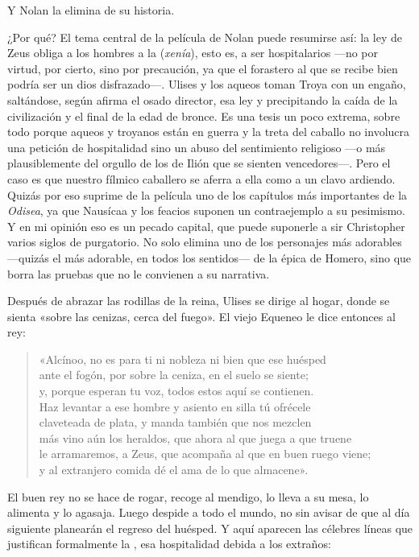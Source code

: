 Y Nolan la elimina de su historia.

¿Por qué? El tema central de la película de Nolan puede resumirse así: la ley de Zeus obliga a los hombres a la  (\emph{xenía}), esto es, a ser hospitalarios ---no por virtud, por cierto, sino por precaución, ya que el forastero al que se recibe bien podría ser un dios disfrazado---. Ulises y los aqueos toman Troya con un engaño, saltándose, según afirma el osado director, esa ley y precipitando la caída de la civilización y el final de la edad de bronce. Es una tesis un poco extrema, sobre todo porque aqueos y troyanos están en guerra y la treta del caballo no involucra una petición de hospitalidad sino un abuso del sentimiento religioso ---o más plausiblemente del orgullo de los de Ilión que se sienten vencedores---. Pero el caso es que nuestro fílmico caballero se aferra a ella como a un clavo ardiendo. Quizás por eso suprime de la película uno de los capítulos más importantes de la \emph{Odisea}, ya que Nausícaa y los feacios suponen un contraejemplo a su pesimismo. Y en mi opinión eso es un pecado capital, que puede suponerle a sir Christopher varios siglos de purgatorio. No solo elimina uno de los personajes más adorables ---quizás el más adorable, en todos los sentidos--- de la épica de Homero, sino que borra las pruebas que no le convienen a su narrativa.

Después de abrazar las rodillas de la reina, Ulises se dirige al hogar, donde se sienta «sobre las cenizas, cerca del fuego».
El viejo Equeneo le dice entonces al rey:

\begin{verse}
«Alcínoo, no es para ti ni nobleza ni bien que ese huésped\\
ante el fogón, por sobre la ceniza, en el suelo se siente;\\
y, porque esperan tu voz, todos estos aquí se contienen.\\
Haz levantar a ese hombre y asiento en silla tú ofrécele\\
claveteada de plata, y manda también que nos mezclen\\
más vino aún los heraldos, que ahora al que juega a que truene\\
le arramaremos, a Zeus, que acompaña al que en buen ruego viene;\\
y al extranjero comida dé el ama de lo que almacene».
\end{verse}

El buen rey no se hace de rogar, recoge al mendigo, lo lleva a su mesa, lo alimenta y lo agasaja. Luego despide a todo el mundo, no sin avisar de que al día siguiente planearán el regreso del huésped. Y aquí aparecen las célebres líneas que justifican formalmente la , esa hospitalidad debida a los extraños:

